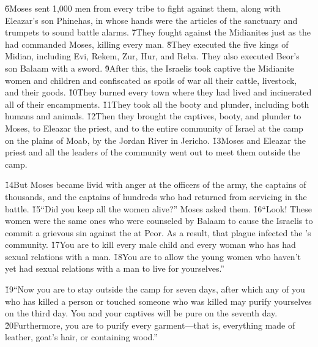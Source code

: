 \v{6}Moses sent 1,000 men from every tribe to fight against them, along with Eleazar's son Phinehas, in whose hands were the articles of the sanctuary and trumpets to sound battle alarms. \v{7}They fought against the Midianites just as the  had commanded Moses, killing every man. \v{8}They executed the five kings of Midian, including Evi, Rekem, Zur, Hur, and Reba. They also executed Beor's son Balaam with a sword. \v{9}After this, the Israelis took captive the Midianite women and children and confiscated as spoils of war all their cattle, livestock, and their goods. \v{10}They burned every town where they had lived and incinerated all of their encampments. \v{11}They took all the booty and plunder, including both humans and animals. \v{12}Then they brought the captives, booty, and plunder to Moses, to Eleazar the priest, and to the entire community of Israel at the camp on the plains of Moab, by the Jordan River in Jericho. \v{13}Moses and Eleazar the priest and all the leaders of the community went out to meet them outside the camp.

\v{14}But Moses became livid with anger at the officers of the army, the captains of thousands, and the captains of hundreds who had returned from servicing in the battle. \v{15}``Did you keep all the women alive?'' Moses asked them. \v{16}``Look! These women were the same ones who were counseled by Balaam to cause the Israelis to commit a grievous sin against the  at Peor. As a result, that plague infected the 's community. \v{17}You are to kill every male child and every woman who has had sexual relations with a man. \v{18}You are to allow the young women who haven't yet had sexual relations with a man to live for yourselves.''

\v{19}``Now you are to stay outside the camp for seven days, after which any of you who has killed a person or touched someone who was killed may purify yourselves on the third day. You and your captives will be pure on the seventh day. \v{20}Furthermore, you are to purify every garment---that is, everything made of leather, goat's hair, or containing wood.''

